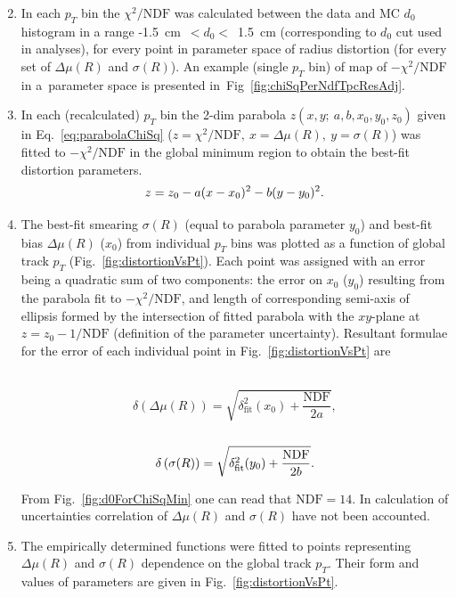   \begin{enumerate}\setcounter{enumi}{1}
   \item In each $p_{T}$ bin the $\chi^{2}/\text{NDF}$ was calculated between the data and MC $d_{0}$ histogram in a range -1.5~cm~$<d_{0}<$~1.5~cm (corresponding to $d_{0}$ cut used in analyses), for every point in parameter space of radius distortion (for every set of $\Delta\mu(R)$ and $\sigma(R)$). An example (single $p_{T}$ bin) of map of $-\chi^{2}/\text{NDF}$ in a~parameter space is presented in~Fig~\ref{fig:chiSqPerNdfTpcResAdj}.
   \item In each (recalculated) $p_{T}$ bin the 2-dim parabola $z\left(x,y;~a,b,x_{0},y_{0},z_{0}\right)$ given in Eq.~\eqref{eq:parabolaChiSq} ($z=\chi^{2}/\text{NDF},~x=\Delta\mu(R),~y=\sigma(R)$) was fitted to $-\chi^{2}/\text{NDF}$ in the global minimum region to obtain the best-fit distortion parameters.\vspace{-5pt}
   \begin{equation}\label{eq:parabolaChiSq}  z=z_{0}-a(x-x_{0})^{2}-b(y-y_{0})^{2}.\vspace{-5pt}\end{equation}
   \item The best-fit smearing $\sigma(R)$ (equal to parabola parameter $y_{0}$) and best-fit bias $\Delta\mu(R)$ ($x_{0}$) from individual $p_{T}$ bins was plotted as a function of global track $p_{T}$ (Fig.~\ref{fig:distortionVsPt}). Each point was assigned with an error being a quadratic sum of two components: the error on $x_{0}$ ($y_{0}$) resulting from the parabola fit to $-\chi^{2}/\text{NDF}$, and length of corresponding semi-axis of ellipsis formed by the intersection of fitted parabola with the $xy$-plane at $z=z_{0}-1/\text{NDF}$ (definition of the parameter uncertainty). Resultant formulae for the error of each individual point in Fig.~\ref{fig:distortionVsPt} are%
   \begin{multicols}{2}~\\[-30pt]
    \begin{equation}\label{eq:errorDeltaMuR}  \delta\left(\Delta\mu(R)\right)=\sqrt{\delta_{\text{fit}}^{2}(x_{0}) + \frac{\text{NDF}}{2a}},\end{equation}
   \break\\[-60pt]
    \begin{equation}\label{eq:errorSigmaR} \delta\left(\sigma(R)\right)=\sqrt{\delta_{\text{fit}}^{2}(y_{0}) + \frac{\text{NDF}}{2b}}.\vspace{-5pt}\end{equation}
    \end{multicols}\vspace*{-7pt}
    From Fig.~\ref{fig:d0ForChiSqMin} one can read that $\text{NDF}=14$. In calculation of uncertainties correlation of $\Delta\mu(R)$ and $\sigma(R)$ have not been accounted.
   \item The empirically determined functions were fitted to points representing $\Delta\mu(R)$ and $\sigma(R)$ dependence on the global track $p_{T}$. Their form and values of parameters are given in Fig.~\ref{fig:distortionVsPt}.
  \end{enumerate}%
  
